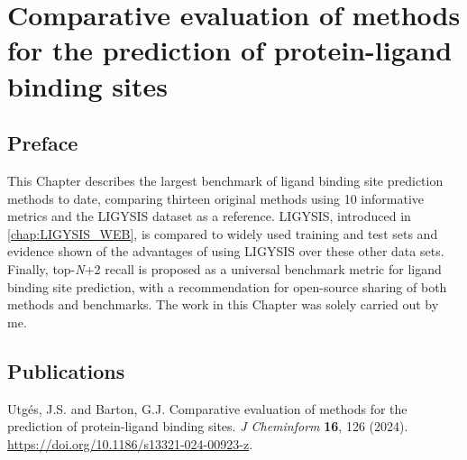 \chapter{Comparative evaluation of methods for the prediction of protein-ligand binding sites}
\label{chap:LBS_COMP}

\section*{Preface}

This Chapter describes the largest benchmark of ligand binding site prediction methods to date, comparing thirteen original methods using 10 informative metrics and the LIGYSIS dataset as a reference. LIGYSIS, introduced in \autoref{chap:LIGYSIS_WEB}, is compared to widely used training and test sets and evidence shown of the advantages of using LIGYSIS over these other data sets. Finally, top-\textit{N}+2 recall is proposed as a universal benchmark metric for ligand binding site prediction, with a recommendation for open-source sharing of both methods and benchmarks. The work in this Chapter was solely carried out by me.

\section*{Publications}

Utgés, J.S. and Barton, G.J. Comparative evaluation of methods for the prediction of protein-ligand binding sites. \textit{J Cheminform} \textbf{16}, 126 (2024). \url{https://doi.org/10.1186/s13321-024-00923-z}.



